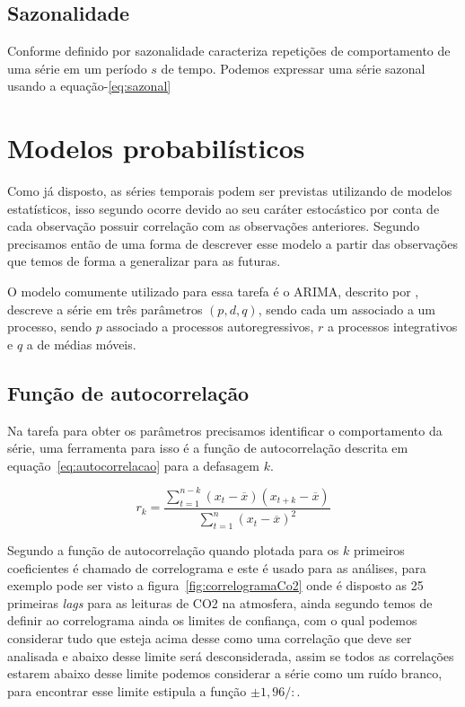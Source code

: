 \documentclass[
	12pt,
	oneside,
	a4paper,
	english,
	brazil
]{abntex2}
\begin{document}
\subsection{Sazonalidade}

Conforme definido por  sazonalidade caracteriza repetições de 
comportamento de uma série em um período $s$ de tempo. Podemos expressar uma 
série sazonal usando a equação-\ref{eq:sazonal}


\section{Modelos probabilísticos}

Como já disposto, as séries temporais podem ser previstas utilizando de modelos 
estatísticos, isso segundo  ocorre devido ao seu caráter 
estocástico por conta de cada observação possuir correlação com as observações 
anteriores. Segundo  precisamos então de uma forma de descrever 
esse modelo a partir das observações que temos de forma a generalizar para as 
futuras.

O modelo comumente utilizado para essa tarefa é o ARIMA, descrito por 
, descreve a série em três parâmetros $(p,d,q)$, sendo cada um 
associado a um processo, sendo $p$ associado a processos autoregressivos, $r$ a 
processos integrativos e $q$ a de médias móveis.

\subsection{Função de autocorrelação}

Na tarefa para obter os parâmetros precisamos identificar o comportamento da 
série, uma ferramenta para isso é a função de autocorrelação descrita em 
equação~\ref{eq:autocorrelacao} para a defasagem $k$.

\begin{equation}
    \label{eq:autocorrelacao}
    r_k = \frac{\sum_{t=1}^{n-k}{(x_t - \overline{x})(x_{t+k} - 
    \overline{x})}}{\sum_{t=1}^{n}{(x_t - \overline{x})^2}}
\end{equation}

Segundo  a função de autocorrelação quando plotada para os 
$k$ primeiros coeficientes é chamado de correlograma e este é usado para as 
análises, para exemplo pode ser visto a figura~\ref{fig:correlogramaCo2} onde é 
disposto as 25 primeiras \textit{lags} para as leituras de CO2 na atmosfera, 
ainda segundo  temos de definir ao correlograma ainda os 
limites de confiança, com o qual podemos considerar tudo que esteja acima desse 
como uma correlação que deve ser analisada e abaixo desse limite será 
desconsiderada, assim se todos as correlações estarem abaixo desse limite 
podemos considerar a série como um ruído branco, para encontrar esse limite 
 estipula a função $\pm{}1,96/:$.
\end{document}

